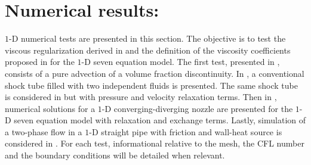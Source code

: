 \section{Numerical results:}\label{sec:1d-num-res-sect4}
$1$-D numerical tests are presented in this section. The objective is to test the viscous regularization derived in  and the definition of the viscosity coefficients proposed in  for the $1$-D seven equation model. The first test, presented in ,  consists of a pure advection of a volume fraction discontinuity. In , a conventional shock tube filled with two independent fluids is presented. The same shock tube is considered in  but with pressure and velocity relaxation terms. Then in , numerical solutions for a $1$-D converging-diverging nozzle are presented for the $1$-D seven equation model with relaxation and exchange terms. Lastly, simulation of a two-phase flow in a $1$-D straight pipe with friction and wall-heat source is considered in . For each test, informational relative to the mesh, the CFL number and the boundary conditions will be detailed when relevant.
